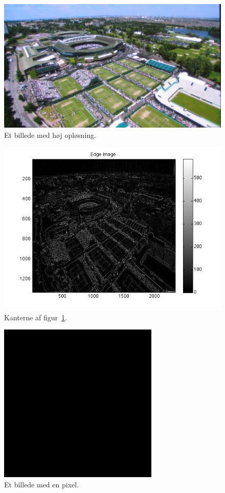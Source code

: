 \documentclass{article}
\begin{document}
	\begin{figure}
		\centering
		\includegraphics[width=4.5in]{test4.jpg}
		\caption{Et billede med høj opløsning.}
		\label{ke4}
	\end{figure}
	\begin{figure}
		\centering
		\includegraphics[width=6in]{test4_result.jpg}
		\caption{Kanterne af figur~\ref{ke4}.}
		\label{ke4r}
	\end{figure}
	\begin{figure}
		\centering
		\includegraphics[width=3in]{test5.jpg}
		\caption{Et billede med en pixel.}
		\label{ke5}
	\end{figure}
\end{document}
